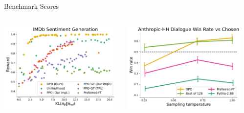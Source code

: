 \documentclass{beamer}
\begin{document}
\begin{frame}{Benchmark Scores}
	\begin{columns}
		\begin{column}{0.33\textwidth}
			\includegraphics[width=\textwidth]{img/results/frontier.pdf}
		\end{column}
		\begin{column}{0.33\textwidth}
			\includegraphics[width=\textwidth]{img/results/dialogue_winrate_vs_temp.pdf}
		\end{column}
		\begin{column}{0.34\textwidth}

\end{column}
\end{columns}
\end{frame}
\end{document}
